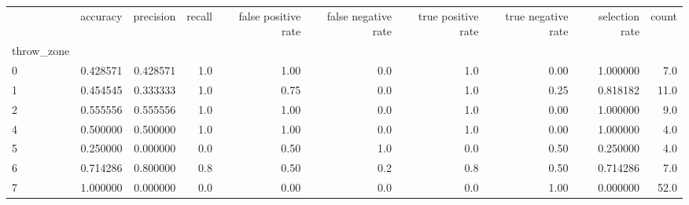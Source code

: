 \begin{tabular}{lrrrrrrrrr}
\toprule
{} &  accuracy &  precision &  recall &  false positive rate &  false negative rate &  true positive rate &  true negative rate &  selection rate &  count \\
throw\_zone &           &            &         &                      &                      &                     &                     &                 &        \\
\midrule
0          &  0.428571 &   0.428571 &     1.0 &                 1.00 &                  0.0 &                 1.0 &                0.00 &        1.000000 &    7.0 \\
1          &  0.454545 &   0.333333 &     1.0 &                 0.75 &                  0.0 &                 1.0 &                0.25 &        0.818182 &   11.0 \\
2          &  0.555556 &   0.555556 &     1.0 &                 1.00 &                  0.0 &                 1.0 &                0.00 &        1.000000 &    9.0 \\
4          &  0.500000 &   0.500000 &     1.0 &                 1.00 &                  0.0 &                 1.0 &                0.00 &        1.000000 &    4.0 \\
5          &  0.250000 &   0.000000 &     0.0 &                 0.50 &                  1.0 &                 0.0 &                0.50 &        0.250000 &    4.0 \\
6          &  0.714286 &   0.800000 &     0.8 &                 0.50 &                  0.2 &                 0.8 &                0.50 &        0.714286 &    7.0 \\
7          &  1.000000 &   0.000000 &     0.0 &                 0.00 &                  0.0 &                 0.0 &                1.00 &        0.000000 &   52.0 \\
\bottomrule
\end{tabular}
